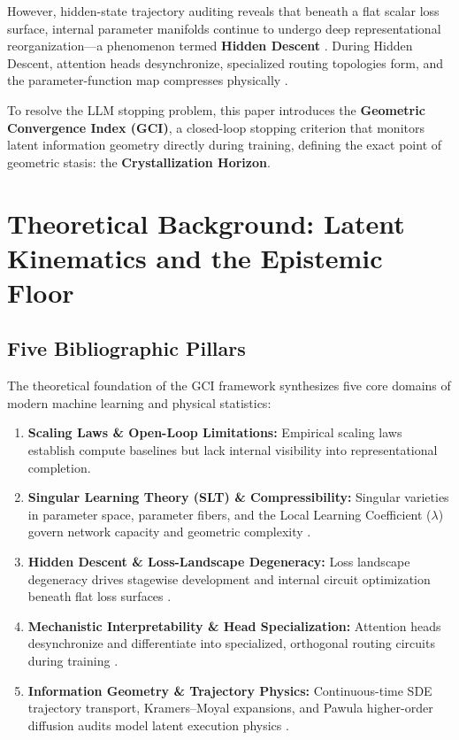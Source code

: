 \documentclass[11pt,twocolumn]{article}
\begin{document}
However, hidden-state trajectory auditing reveals that beneath a flat scalar loss surface, internal parameter manifolds continue to undergo deep representational reorganization—a phenomenon termed \textbf{Hidden Descent} \cite{massif}. During Hidden Descent, attention heads desynchronize, specialized routing topologies form, and the parameter-function map compresses physically \cite{smdl, valle2018deep, wang2024}.

To resolve the LLM stopping problem, this paper introduces the \textbf{Geometric Convergence Index (GCI)}, a closed-loop stopping criterion that monitors latent information geometry directly during training, defining the exact point of geometric stasis: the \textbf{Crystallization Horizon}.

\section{Theoretical Background: Latent Kinematics and the Epistemic Floor}

\subsection{Five Bibliographic Pillars}
The theoretical foundation of the GCI framework synthesizes five core domains of modern machine learning and physical statistics:
\begin{enumerate}
    \item \textbf{Scaling Laws \& Open-Loop Limitations:} Empirical scaling laws \cite{chinchilla, vaswani2017} establish compute baselines but lack internal visibility into representational completion.
    \item \textbf{Singular Learning Theory (SLT) \& Compressibility:} Singular varieties in parameter space, parameter fibers, and the Local Learning Coefficient ($\lambda$) govern network capacity and geometric complexity \cite{slt, watanabe2009algebraic, lau2024, smdl, grillo2026, solis2026zenodo22697472}.
    \item \textbf{Hidden Descent \& Loss-Landscape Degeneracy:} Loss landscape degeneracy drives stagewise development and internal circuit optimization beneath flat loss surfaces \cite{power2022grokking, hoogland2024, zhang2025, jiang2026}.
    \item \textbf{Mechanistic Interpretability \& Head Specialization:} Attention heads desynchronize and differentiate into specialized, orthogonal routing circuits during training \cite{elhage2021mathematical, elhage2022toy, olsson2022in, wang2024}.
    \item \textbf{Information Geometry \& Trajectory Physics:} Continuous-time SDE trajectory transport, Kramers--Moyal expansions, and Pawula higher-order diffusion audits model latent execution physics \cite{amari2016information, nielsen2020riemannian, pawula1967, gao2019, massif}.
\end{enumerate}
\end{document}
